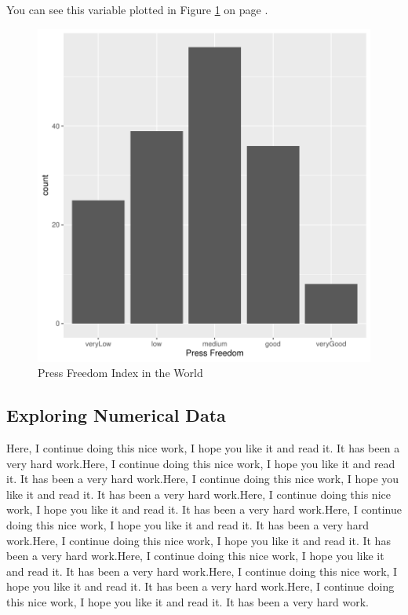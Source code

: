 \documentclass[11pt]{article}
\begin{document}

You can see this variable plotted in Figure \ref{catBarplot} on page \pageref{catBarplot}.



\begin{figure}[h]
\centering
\begin{adjustbox}{width=7cm,height=5cm} %
\includegraphics{WorkInR_forPrinter-catBarplot}
\end{adjustbox}
\caption{Press Freedom Index in the World}  %
\label{catBarplot} %
\end{figure}



\subsection{Exploring Numerical Data}\label{numexplo}

Here, I continue doing this nice work, I hope you like it and read it. It has been a very hard work.Here, I continue doing this nice work, I hope you like it and read it. It has been a very hard work.Here, I continue doing this nice work, I hope you like it and read it. It has been a very hard work.Here, I continue doing this nice work, I hope you like it and read it. It has been a very hard work.Here, I continue doing this nice work, I hope you like it and read it. It has been a very hard work.Here, I continue doing this nice work, I hope you like it and read it. It has been a very hard work.Here, I continue doing this nice work, I hope you like it and read it. It has been a very hard work.Here, I continue doing this nice work, I hope you like it and read it. It has been a very hard work.Here, I continue doing this nice work, I hope you like it and read it. It has been a very hard work.
\end{document}
